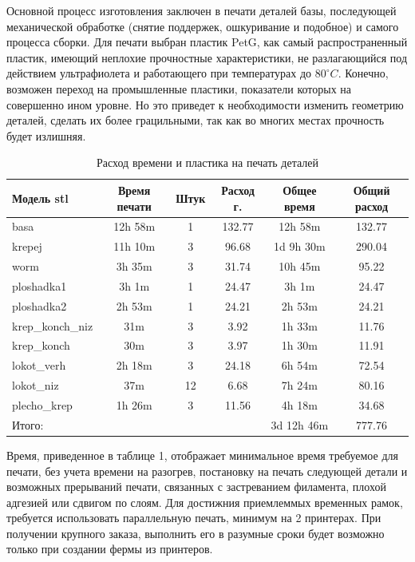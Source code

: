Основной процесс изготовления заключен в печати деталей базы, последующей механической обработке (снятие поддержек, ошкуривание и подобное) и самого процесса сборки. Для печати выбран пластик PetG, как самый распространенный пластик, имеющий неплохие прочностные характеристики, не разлагающийся под действием ультрафиолета и работающего при температурах до $80^{\circ} C$. Конечно, возможен переход на промышленные пластики, показатели которых на совершенно ином уровне. Но это приведет к необходимости изменить геометрию деталей, сделать их более грацильными, так как во многих местах прочность будет излишняя.

\begin{table}[h!]
    \centering
\begin{tabular}{|l|c|c|c|c|c|}
\hline
Модель stl &  Время печати & Штук  & Расход г. & Общее время & Общий расход\\
\hline
basa  &  12h 58m & 1 & 132.77 & 12h 58m & 132.77 \\
\hline
krepej  &  11h 10m & 3 & 96.68 & 1d 9h 30m & 290.04\\
\hline
worm  &  3h 35m & 3 & 31.74 & 10h 45m & 95.22 \\
\hline
ploshadka1  &  3h 1m & 1 & 24.47 & 3h 1m & 24.47\\
\hline
ploshadka2  &  2h 53m & 1 & 24.21 & 2h 53m & 24.21\\
\hline
krep\_konch\_niz  &  31m & 3 & 3.92 & 1h 33m & 11.76\\
\hline
krep\_konch  &  30m & 3 & 3.97 & 1h 30m & 11.91\\
\hline
lokot\_verh  &  2h 18m & 3 & 24.18 & 6h 54m  & 72.54\\
\hline
lokot\_niz  &  37m & 12 & 6.68 & 7h 24m & 80.16\\
\hline
plecho\_krep  & 1h 26m & 3 & 11.56 & 4h 18m & 34.68\\
\hline
Итого:  &  &  &  & 3d 12h 46m & 777.76\\
\hline
\end{tabular}
\caption{Расход времени и пластика на печать деталей}
\end{table}

Время, приведенное в таблице 1, отображает минимальное время требуемое для печати, без учета времени на разогрев, постановку на печать следующей детали и возможных прерываний печати, связанных с застреванием филамента, плохой адгезией или сдвигом по слоям. Для достижния приемлеммых временных рамок, требуется использовать параллельную печать, минимум на 2 принтерах. При получении крупного заказа, выполнить его в разумные сроки будет возможно только при создании фермы из принтеров. 

